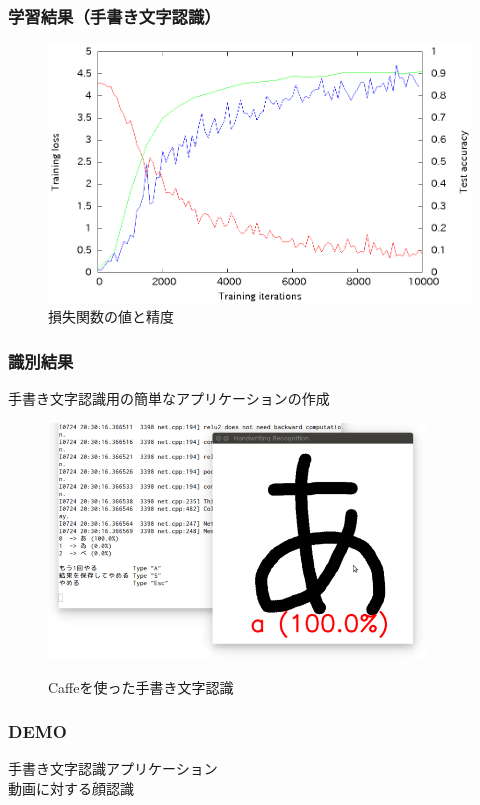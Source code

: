 \documentclass[dvipdfmx,11pt,notheorems]{beamer}
\theoremstyle{definition}
\begin{document}
\begin{frame}\frametitle{学習結果（手書き文字認識）}
 \begin{figure}[ht]
 \centering
 \includegraphics[scale=0.85]{fig/eps/result_train_test_tegaki_graph.eps}
 \caption{損失関数の値と精度}
\end{figure}
\end{frame}

\begin{frame}\frametitle{識別結果}
手書き文字認識用の簡単なアプリケーションの作成
\begin{figure}[t]
  \begin{center}
    \includegraphics[clip,width=10cm, bb = 0 0 724 453]{./fig/png/tegaki_result.png}\\
  \end{center}
  \caption{Caffeを使った手書き文字認識}
\end{figure}
\end{frame}

\begin{frame}\frametitle{DEMO}
\centering
{}\large{手書き文字認識アプリケーション}\\

\large{動画に対する顔認識}
\end{frame}
\end{document}
